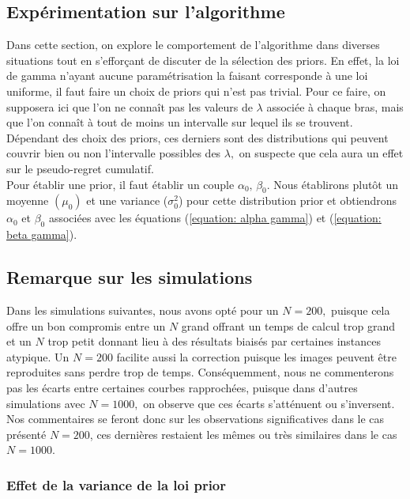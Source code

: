 \documentclass[letterpaper,11pt]{article}
\begin{document}
\subsection{Expérimentation sur l'algorithme}

Dans cette section, on explore le comportement de l'algorithme dans diverses situations tout en s'efforçant de discuter de la sélection des priors. En effet, la loi de gamma n'ayant aucune paramétrisation la faisant corresponde à une loi uniforme, il faut faire un choix de priors qui n'est pas trivial. Pour ce faire, on supposera ici que l'on ne connaît pas les valeurs de $\lambda$ associée à chaque bras, mais que l'on connaît à tout de moins un intervalle sur lequel ils se trouvent. Dépendant des choix des priors, ces derniers sont des distributions qui peuvent couvrir bien ou non l'intervalle possibles des $\lambda,$ on suspecte que cela aura un effet sur le pseudo-regret cumulatif.\\

Pour établir une prior, il faut établir un couple $\alpha_0,\,\beta_0.$ Nous établirons plutôt un moyenne $(\mu_0)$ et une variance ($\sigma_0^2$) pour cette distribution prior et obtiendrons $\alpha_0$ et $\beta_0$ associées avec les équations (\ref{equation: alpha gamma}) et (\ref{equation: beta gamma}).

\subsection*{Remarque sur les simulations}

Dans les simulations suivantes, nous avons opté pour un $N=200,$ puisque cela offre un bon compromis entre un $N$  grand offrant un temps de calcul trop grand et un $N$ trop petit donnant lieu à des résultats biaisés par certaines instances atypique. Un $N=200$ facilite aussi la correction puisque les images peuvent être reproduites sans perdre trop de temps. Conséquemment, nous ne commenterons pas les écarts entre certaines courbes rapprochées, puisque dans d'autres simulations avec $N=1000,$ on observe que ces écarts s'atténuent ou s'inversent. Nos commentaires se feront donc sur les observations significatives dans le cas présenté $N=200$, ces dernières restaient les mêmes  ou très similaires dans le cas $N=1000.$

\subsubsection{Effet de la variance de la loi prior}
\end{document}
